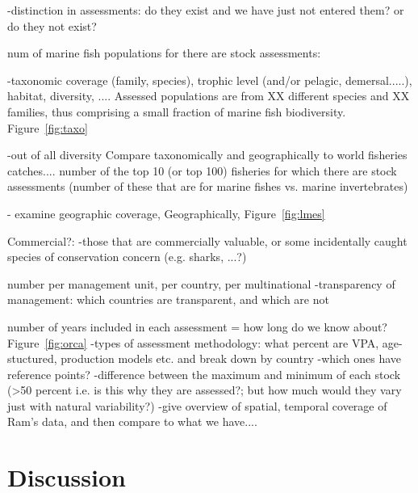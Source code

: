 \documentclass[letterpaper,12pt]{article}
\begin{document}
-distinction in assessments: do they exist and we have just not entered them? or do they not exist?

num of marine fish populations for there are stock assessments:

-taxonomic coverage (family, species), trophic level (and/or pelagic, demersal.....), habitat, diversity, ....   Assessed populations are from XX different species and XX families, thus comprising a small fraction of marine fish biodiversity.  Figure~\ref{fig:taxo}

-out of all diversity
Compare taxonomically and geographically to world fisheries catches....
number of the top 10 (or top 100) fisheries for which there are stock assessments (number of these that are for marine fishes vs. marine invertebrates) 

- examine geographic coverage, 
Geographically, 
Figure~\ref{fig:lmes}

Commercial?: -those that are commercially valuable, or some incidentally caught species of conservation concern (e.g. sharks, ...?)


number per management unit, per country, per multinational 
-transparency of management: which countries are transparent, and which are not 

number of years included in each assessment = how long do we know about? Figure~\ref{fig:orca} 
-types of assessment methodology: what percent are VPA, age-stuctured, production models etc. and break down by country 
-which ones have reference points? 
-difference between the maximum and minimum of each stock (>50 percent i.e. is this why they are assessed?; but how much would they vary just with natural variability?) 
-give overview of spatial, temporal coverage of Ram's data, and then compare to what we have.... 


\newpage
\section{Discussion}
\end{document}
